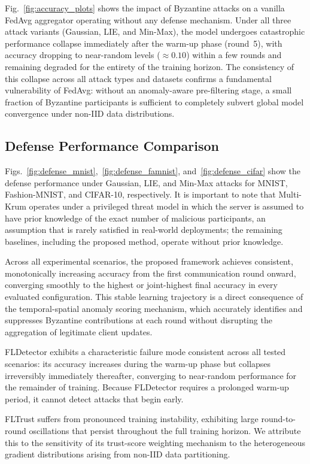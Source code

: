 \documentclass[journal]{IEEEtran}
\begin{document}
Fig.~\ref{fig:accuracy_plots} shows the impact of Byzantine attacks on a vanilla FedAvg aggregator operating without any defense mechanism. Under all three attack variants (Gaussian, LIE, and Min-Max), the model undergoes catastrophic performance collapse immediately after the warm-up phase (round~5), with accuracy dropping to near-random levels ($\approx 0.10$) within a few rounds and remaining degraded for the entirety of the training horizon. The consistency of this collapse across all attack types and datasets confirms a fundamental vulnerability of FedAvg: without an anomaly-aware pre-filtering stage, a small fraction of Byzantine participants is sufficient to completely subvert global model convergence under non-IID data distributions.

\subsection{Defense Performance Comparison}

Figs.~\ref{fig:defense_mnist},~\ref{fig:defense_famnist}, and~\ref{fig:defense_cifar} show the defense performance under Gaussian, LIE, and Min-Max attacks for MNIST, Fashion-MNIST, and CIFAR-10, respectively. It is important to note that Multi-Krum operates under a privileged threat model in which the server is assumed to have prior knowledge of the exact number of malicious participants, an assumption that is rarely satisfied in real-world deployments; the remaining baselines, including the proposed method, operate without prior knowledge.

Across all experimental scenarios, the proposed framework achieves consistent, monotonically increasing accuracy from the first communication round onward, converging smoothly to the highest or joint-highest final accuracy in every evaluated configuration. This stable learning trajectory is a direct consequence of the temporal-spatial anomaly scoring mechanism, which accurately identifies and suppresses Byzantine contributions at each round without disrupting the aggregation of legitimate client updates.

FLDetector exhibits a characteristic failure mode consistent across all tested scenarios: its accuracy increases during the warm-up phase but collapses irreversibly immediately thereafter, converging to near-random performance for the remainder of training. Because FLDetector requires a prolonged warm-up period, it cannot detect attacks that begin early.

FLTrust suffers from pronounced training instability, exhibiting large round-to-round oscillations that persist throughout the full training horizon. We attribute this to the sensitivity of its trust-score weighting mechanism to the heterogeneous gradient distributions arising from non-IID data partitioning.
\end{document}
